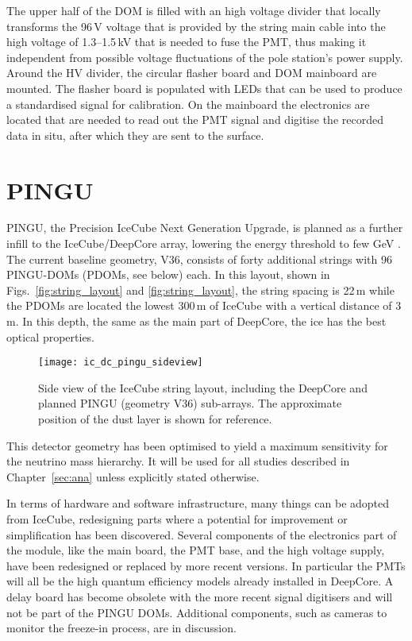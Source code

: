 The upper half of the DOM is filled with an high voltage divider that locally 
transforms the 96\,V voltage that is provided by the string main cable into the 
high voltage of 1.3--1.5\,kV that is needed to fuse the PMT, thus making it 
independent from possible voltage fluctuations of the pole station's power 
supply. Around the HV divider, the circular flasher board and DOM mainboard are 
mounted. The flasher board is populated with LEDs that can be used to produce a 
standardised signal for calibration. On the mainboard the electronics are 
located that are needed to read out the PMT signal and digitise the recorded 
data in situ, after which they are sent to the surface.



\section{PINGU}
\label{sec:PINGU}

PINGU, the Precision IceCube Next Generation Upgrade, is planned as a further 
infill to the IceCube/DeepCore array, lowering the energy threshold to few GeV 
\cite{LoI}. The current baseline geometry, V36, consists of forty additional 
strings with 96 PINGU-DOMs (PDOMs, see below) each. In this layout, shown in
Figs.~\ref{fig:string_layout} and \ref{fig:string_layout}, the string spacing is
22\,m while the PDOMs are located the lowest 300\,m of IceCube with a vertical
distance of 3\,m. In this depth, the same as the main part of DeepCore, the ice
has the best optical properties.

\begin{figure}[htp]
 \centering
 \texttt{[image: ic\_dc\_pingu\_sideview]}
 \caption{Side view of the IceCube string layout, including the DeepCore and
  planned PINGU (geometry V36) sub-arrays. The approximate position of the dust
  layer is shown for reference.}
 \label{fig:string_layout_side}
\end{figure}

This detector geometry has been optimised to yield a maximum sensitivity for 
the neutrino mass hierarchy. It will be used for all studies described in 
Chapter~\ref{sec:ana} unless explicitly stated otherwise.

In terms of hardware and software infrastructure, many things can be adopted 
from IceCube, redesigning parts where a potential for improvement or 
simplification has been discovered. Several components of the electronics part
of the module, like the main board, the PMT base, and the high voltage supply,
have been redesigned or replaced by more recent versions. In particular the PMTs
will all be the high quantum efficiency models already installed in DeepCore.
A delay board has become obsolete with the more recent signal digitisers and
will not be part of the PINGU DOMs. Additional components, such as cameras to
monitor the freeze-in process, are in discussion.

